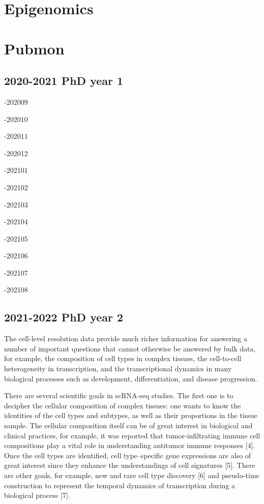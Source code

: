\documentclass[
]{book}
\begin{document}
\hypertarget{epigenomics}{%
\chapter{Epigenomics}\label{epigenomics}}

\hypertarget{pubmon-1}{%
\chapter{Pubmon}\label{pubmon-1}}

\hypertarget{phd-year-1}{%
\section{2020-2021 PhD year 1}\label{phd-year-1}}

-202009

-202010

-202011

-202012

-202101

-202102

-202103

-202104

-202105

-202106

-202107

-202108

\hypertarget{phd-year-2}{%
\section{2021-2022 PhD year 2}\label{phd-year-2}}

The cell-level resolution data provide much richer information for answering a number of important questions that cannot otherwise be answered by bulk data, for example, the composition of cell types in complex tissues, the cell-to-cell heterogeneity in transcription, and the transcriptional dynamics in many biological processes such as development, differentiation, and disease progression.

There are several scientific goals in scRNA-seq studies. The first one is to decipher the cellular composition of complex tissues: one wants to know the identities of the cell types and subtypes, as well as their proportions in the tissue sample. The cellular composition itself can be of great interest in biological and clinical practices, for example, it was reported that tumor-infiltrating immune cell compositions play a vital role in understanding antitumor immune responses {[}4{]}. Once the cell types are identified, cell type--specific gene expressions are also of great interest since they enhance the understandings of cell signatures {[}5{]}. There are other goals, for example, new and rare cell type discovery {[}6{]} and pseudo-time construction to represent the temporal dynamics of transcription during a biological process {[}7{]}.
\end{document}
